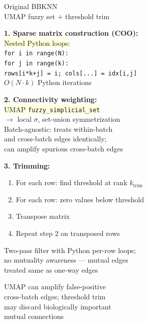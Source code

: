 \documentclass[8pt]{article}
\newlength{\colw}
\begin{document}
\noindent
\begin{minipage}[t]{\colw}
\begin{tcolorbox}[colback=hdrA, colframe=hdrA, fontupper=\bfseries\footnotesize\color{white},
    arc=2pt, left=2pt, right=2pt, top=1pt, bottom=1pt]
\centering Original BBKNN\\[-2pt]
{\scriptsize\mdseries UMAP fuzzy set + threshold trim}
\end{tcolorbox}
\vspace{1pt}

\begin{warnbox}
\textbf{1. Sparse matrix construction (COO):}\\
\colorbox{lightyellow}{Nested Python loops:}\\
\texttt{for i in range(N):}\\
\quad\texttt{for j in range(k):}\\
\quad\quad\texttt{rows[i*k+j] = i; cols[...] = idx[i,j]}\\
{\scriptsize\color{removed} $O(N \cdot k)$ Python iterations}
\end{warnbox}\vspace{1pt}

\begin{warnbox}
\textbf{2. Connectivity weighting:}\\
\colorbox{lightyellow}{UMAP \texttt{fuzzy\_simplicial\_set}}\\
$\to$ local $\sigma$, set-union symmetrization\\[2pt]
{\scriptsize\color{removed} Batch-agnostic: treats within-batch\\
and cross-batch edges identically;\\
can amplify spurious cross-batch edges}
\end{warnbox}\vspace{1pt}

\begin{warnbox}
\textbf{3. Trimming:}
\begin{enumerate}[leftmargin=1em, itemsep=0pt, topsep=1pt, parsep=0pt]
\item For each row: find threshold at rank $k_\text{trim}$
\item For each row: zero values below threshold
\item Transpose matrix
\item Repeat step 2 on transposed rows
\end{enumerate}
{\scriptsize\color{removed} Two-pass filter with Python per-row loops;\\
no mutuality awareness --- mutual edges\\
treated same as one-way edges}
\end{warnbox}

\vspace{4pt}
\begin{center}
{\scriptsize\color{black!50} UMAP can amplify false-positive\\
cross-batch edges; threshold trim\\
may discard biologically important\\
mutual connections}
\end{center}
\end{minipage}%
\end{document}
